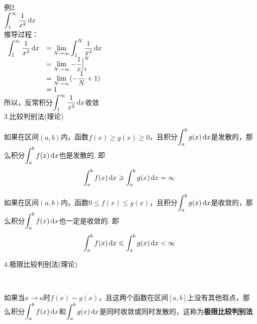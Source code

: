 例2.\\
\phantom{例}$\displaystyle\int_1^{\infty}\frac{1}{x^2}\mathop{}\!\mathrm{d} x$\\
推导过程：\\
$\begin{array}{>{\displaystyle}r >{\displaystyle}l}
\int_1^{\infty}\frac{1}{x^2}\dif x & =\lim_{N\to\infty}\int_1^N\frac{1}{x^2}\dif x\\
& =\lim_{N\to\infty}-\frac{1}{x}\Big|_1^N\\
& =\lim_{N\to\infty}(-\frac{1}{N}+1)\\
& =1
\end{array}$\\
所以，反常积分$\displaystyle\int_1^{\infty}\frac{1}{x^2}\mathop{}\!\mathrm{d} x$收敛\\[4ex]

3.比较判别法(理论)
\begin{center}
\begin{boxedminipage}{\textwidth}
如果在区间$(a,b)$内，函数$f(x)\geqslant g(x)\geqslant 0$，且积分$\displaystyle\int_a^bg(x)\mathop{}\!\mathrm{d} x$是发散的，那么积分$\displaystyle\int_a^bf(x)\mathop{}\!\mathrm{d} x$也是发散的. 即
\[\int_a^bf(x)\mathop{}\!\mathrm{d} x\geqslant\int_a^bg(x)\mathop{}\!\mathrm{d} x=\infty\]
\end{boxedminipage}
\end{center}\vspace{2ex}

\begin{center}
\begin{boxedminipage}{\textwidth}
如果在区间$(a,b)$内，函数$0\leqslant f(x)\leqslant g(x)$，且积分$\displaystyle\int_a^bg(x)\mathop{}\!\mathrm{d} x$是收敛的，那么积分$\displaystyle\int_a^bf(x)\mathop{}\!\mathrm{d} x$也一定是收敛的. 即
\[\int_a^bf(x)\mathop{}\!\mathrm{d} x\leqslant\int_a^bg(x)\mathop{}\!\mathrm{d} x<\infty\]
\end{boxedminipage}
\end{center}\vspace{4ex}

4.极限比较判别法(理论)
\begin{center}
\\[2ex]
\begin{boxedminipage}{\textwidth}
如果当$x\to a$时$f(x)\sim g(x)$，且这两个函数在区间$[a,b]$上没有其他瑕点，那么积分$\displaystyle\int_a^bf(x)\mathop{}\!\mathrm{d} x$和$\displaystyle\int_a^bg(x)\mathop{}\!\mathrm{d} x$是同时收敛或同时发散的，这称为\textbf{极限比较判别法}
\end{boxedminipage}
\end{center}

